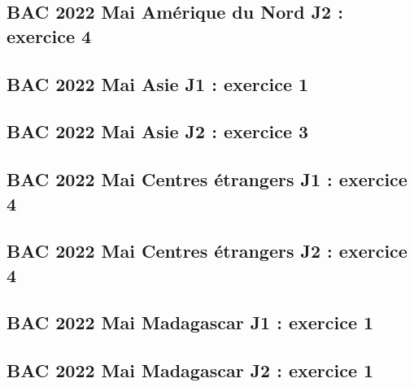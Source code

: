 \documentclass[lang=fr,edition=teacher,layout=sheet]{mxbook}
\begin{document}
\begingroup\endgroup
\par\bigskip
{}\subsection*{BAC 2022 Mai Amérique du Nord J2 : exercice 4}
\begingroup\endgroup
\par\bigskip
{}\subsection*{BAC 2022 Mai Asie J1 : exercice 1}
\begingroup\endgroup
\par\bigskip
{}\subsection*{BAC 2022 Mai Asie J2 : exercice 3}
\begingroup\endgroup
\par\bigskip
{}\subsection*{BAC 2022 Mai Centres étrangers J1 : exercice 4}
\begingroup\endgroup
\par\bigskip
{}\subsection*{BAC 2022 Mai Centres étrangers J2 : exercice 4}
\begingroup\endgroup
\par\bigskip
{}\subsection*{BAC 2022 Mai Madagascar J1 : exercice 1}
\begingroup\endgroup
\par\bigskip
{}\subsection*{BAC 2022 Mai Madagascar J2 : exercice 1}
\end{document}

